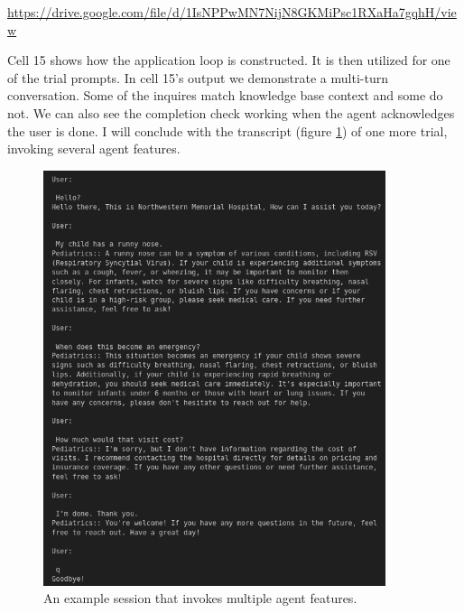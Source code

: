 \documentclass[11pt,letterpaper]{article}
\begin{document}
\noindent \url{https://drive.google.com/file/d/1IsNPPwMN7NijN8GKMiPsc1RXaHa7gqhH/view}

Cell 15 shows how the application loop is constructed. It is then utilized for one of the trial prompts. In cell 15's output we demonstrate a multi-turn conversation. Some of the inquires match knowledge base context and some do not. We can also see the completion check working when the agent acknowledges the user is done. I will conclude with the transcript (figure \ref{fig:transcript}) of one more trial, invoking several agent features.

\begin{figure}[h!]
    \centering
    \includegraphics[height=345pt]{transcript.png}
    \caption{An example session that invokes multiple agent features.}
    \label{fig:transcript}
\end{figure}
\end{document}
